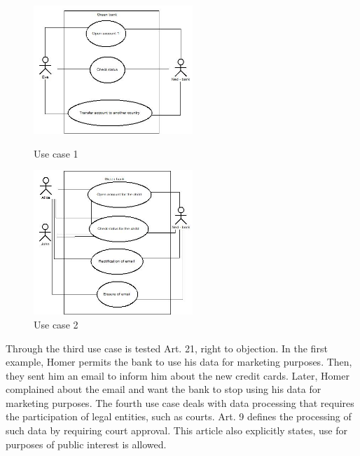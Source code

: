 \documentclass[11pt,english]{article}
\begin{document}
\begin{figure}[H]
\centering
\begin{minipage}{.5\textwidth}
  \centering
  \includegraphics[width=6cm,scale=0.5]{images/use case1.jpg}
  \caption{Use case 1}
  \label{fig:usecase1}
\end{minipage}%
\begin{minipage}{.5\textwidth}
  \centering
  \includegraphics[width=6cm,scale=0.5]{images/use case2.jpg}
  \caption{Use case 2}
  \label{fig:usecase2}
\end{minipage}
\end{figure}
Through the third use case is tested Art. 21, right to objection. In the first example, Homer permits the bank to use his data for marketing purposes. Then, they sent him an email to inform him about the new credit cards. Later, Homer complained about the email and want the bank to stop using his data for marketing purposes. \newline The fourth use case deals with data processing that requires the participation of legal entities, such as courts. Art. 9 defines the processing of such data by requiring court approval. This article also explicitly states, use for purposes of public interest is allowed.
\end{document}
